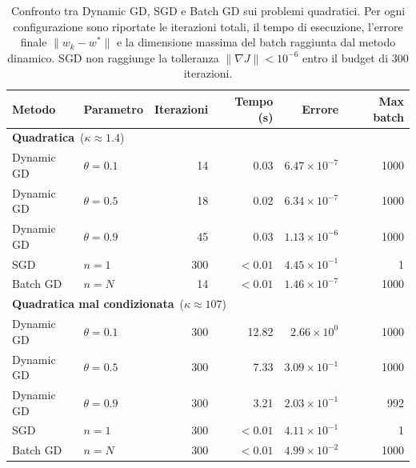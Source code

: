 \documentclass[a4paper,12pt]{article}
\numberwithin{equation}{section}
\numberwithin{figure}{section}
\numberwithin{table}{section}
\begin{document}
\begin{table}[h]
\centering
\small
\renewcommand{\arraystretch}{1.3}
\setlength{\tabcolsep}{4pt}
\begin{tabular}{l l r r r r}
\toprule
\textbf{Metodo} & \textbf{Parametro} & \textbf{Iterazioni} &
\textbf{Tempo (s)} & \textbf{Errore} & \textbf{Max batch} \\
\midrule
\multicolumn{6}{l}{\textbf{Quadratica}\ ($\kappa \approx 1.4$)} \\ \hline
  Dynamic GD & $\theta=0.1$ & 14 & 0.03 & $6.47\times10^{-7}$ & 1000 \\
  Dynamic GD & $\theta=0.5$ & 18 & 0.02 & $6.34\times10^{-7}$ & 1000 \\
  Dynamic GD & $\theta=0.9$ & 45 & 0.03 & $1.13\times10^{-6}$ & 1000 \\
  SGD & $n=1$ & 300 & $<0.01$ & $4.45\times10^{-1}$ & 1 \\
  Batch GD & $n=N$ & 14 & $<0.01$ & $1.46\times10^{-7}$ & 1000 \\
\hline
\multicolumn{6}{l}{\textbf{Quadratica mal condizionata}\ ($\kappa \approx 107$)} \\ \hline
  Dynamic GD & $\theta=0.1$ & 300 & 12.82 & $2.66\times10^{0}$ & 1000 \\
  Dynamic GD & $\theta=0.5$ & 300 & 7.33 & $3.09\times10^{-1}$ & 1000 \\
  Dynamic GD & $\theta=0.9$ & 300 & 3.21 & $2.03\times10^{-1}$ & 992 \\
  SGD & $n=1$ & 300 & $<0.01$ & $4.11\times10^{-1}$ & 1 \\
  Batch GD & $n=N$ & 300 & $<0.01$ & $4.99\times10^{-2}$ & 1000 \\
\bottomrule
\end{tabular}
\caption{Confronto tra Dynamic GD, SGD e Batch GD sui problemi quadratici.
Per ogni configurazione sono riportate le iterazioni totali, il tempo di
esecuzione, l'errore finale $\|w_k - w^*\|$ e la dimensione massima del batch
raggiunta dal metodo dinamico. SGD non raggiunge la tolleranza
$\|\nabla J\| < 10^{-6}$ entro il budget di 300 iterazioni.}
\label{tab:6_1}
\end{table}
\end{document}
